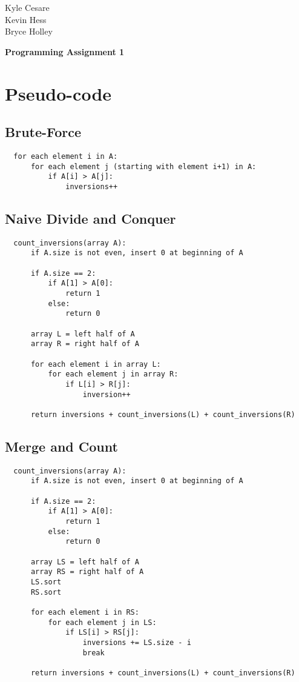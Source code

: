 \documentclass[12pt,letterpaper]{article}
\begin{document}
\begin{flushright}
Kyle Cesare \\
Kevin Hess \\
Bryce Holley
\end{flushright}

{\center\textbf{Programming Assignment 1} \\}

\section{Pseudo-code}

\subsection{Brute-Force}

\begin{verbatim}
  for each element i in A:
      for each element j (starting with element i+1) in A:
          if A[i] > A[j]:
              inversions++
\end{verbatim}

\subsection{Naive Divide and Conquer}

\begin{verbatim}
  count_inversions(array A):
      if A.size is not even, insert 0 at beginning of A
      
      if A.size == 2:
          if A[1] > A[0]:
              return 1
          else:
              return 0
      
      array L = left half of A
      array R = right half of A
      
      for each element i in array L:
          for each element j in array R:
              if L[i] > R[j]:
                  inversion++
      
      return inversions + count_inversions(L) + count_inversions(R)
\end{verbatim}

\subsection{Merge and Count}
    
\begin{verbatim}
  count_inversions(array A):
      if A.size is not even, insert 0 at beginning of A
      
      if A.size == 2:
          if A[1] > A[0]:
              return 1
          else:
              return 0
      
      array LS = left half of A
      array RS = right half of A
      LS.sort
      RS.sort
      
      for each element i in RS:
          for each element j in LS:
              if LS[i] > RS[j]:
                  inversions += LS.size - i
                  break
      
      return inversions + count_inversions(L) + count_inversions(R)
\end{verbatim}
\end{document}
